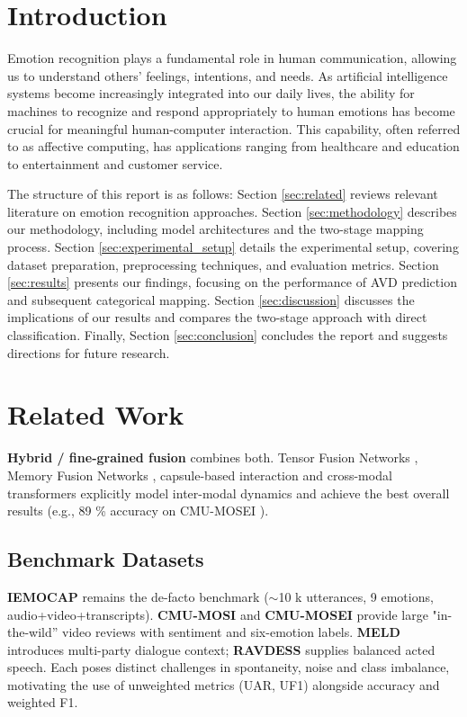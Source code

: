 \documentclass[12pt]{article}
\begin{document}

\doublespacing
\section{Introduction}
\label{sec:intro}
Emotion recognition plays a fundamental role in human communication, allowing us to understand others' feelings, intentions, and needs. As artificial intelligence systems become increasingly integrated into our daily lives, the ability for machines to recognize and respond appropriately to human emotions has become crucial for meaningful human-computer interaction. This capability, often referred to as affective computing, has applications ranging from healthcare and education to entertainment and customer service.

The structure of this report is as follows: Section \ref{sec:related} reviews relevant literature on emotion recognition approaches. Section \ref{sec:methodology} describes our methodology, including model architectures and the two-stage mapping process. Section \ref{sec:experimental_setup} details the experimental setup, covering dataset preparation, preprocessing techniques, and evaluation metrics. Section \ref{sec:results} presents our findings, focusing on the performance of AVD prediction and subsequent categorical mapping. Section \ref{sec:discussion} discusses the implications of our results and compares the two-stage approach with direct classification. Finally, Section \ref{sec:conclusion} concludes the report and suggests directions for future research.\section{Related Work}
\label{sec:related_work}

\textbf{Hybrid / fine-grained fusion} combines both.  Tensor Fusion
Networks \cite{zadeh2018multimodal_tfn}, Memory Fusion Networks
\cite{zadeh2018mfn}, capsule-based interaction
\cite{wang2019words} and cross-modal transformers
\cite{tsai2019mult} explicitly model inter-modal dynamics and achieve
the best overall results (e.g., 89 \% accuracy on CMU-MOSEI
\cite{mittal2020m3er}).

\subsection{Benchmark Datasets}
\textbf{IEMOCAP} \cite{busso2008iemocap} remains the de-facto benchmark
($\sim$10 k utterances, 9 emotions, audio+video+transcripts).  
\textbf{CMU-MOSI} \cite{zadeh2016mosi} and
\textbf{CMU-MOSEI} \cite{zadeh2018multimodal} provide large
"in-the-wild'' video reviews with sentiment and six-emotion labels.
\textbf{MELD} \cite{poria2018meld} introduces multi-party dialogue
context; \textbf{RAVDESS} \cite{livingstone2018ravdess} supplies
balanced acted speech.  Each poses distinct challenges in spontaneity,
noise and class imbalance, motivating the use of unweighted metrics
(UAR, UF1) alongside accuracy and weighted F1.
\end{document}
